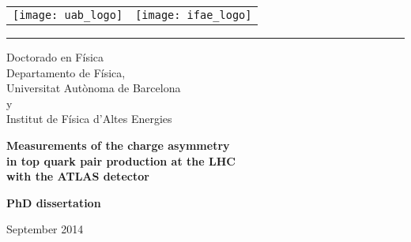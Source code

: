 \documentclass[titlepage]{article}
\begin{document}
\centering
\par
\vspace{6pt}
\begin{tabular}{p{5cm}p{5cm}}
\texttt{[image: uab\_logo]}&
\texttt{[image: ifae\_logo]}\\
\end{tabular}
\par
\vspace{6pt}
\hrule 
\par
\vspace{6pt}
\par
\begin{Large}
Doctorado en Física\\
\vspace{-5pt}
Departamento de Física,\\
\vspace{-10pt}
Universitat Autònoma de Barcelona\\
\vspace{-10pt}
y\\
\vspace{-10pt}
Institut de F\'isica d'Altes Energies\\
\end{Large}
\vspace{80pt}
{\huge \bfseries Measurements of the charge asymmetry } \\
\vspace{6pt}
{\huge \bfseries in top quark pair production at the LHC } \\
\vspace{6pt}
{\huge \bfseries  with the ATLAS detector }
\vspace{40pt} \\

\begin{large}
\textbf{PhD dissertation}
\par
\vspace{2pt}
\par
September 2014 \\ 
\par
\vspace{48pt}
\par
\end{large} 
\end{document}

